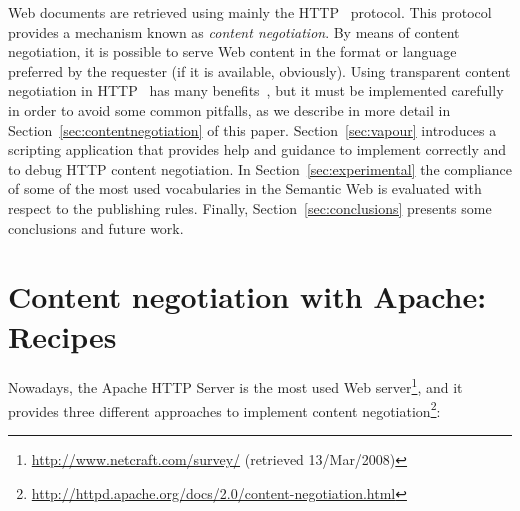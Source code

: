 \documentclass{../templates/llncs}
\begin{document}
Web documents are retrieved using mainly the HTTP~\cite{HTTP} 
protocol. This protocol provides a mechanism known as \textit{content negotiation}. 
By means of content negotiation, it is possible to serve Web content in the format or 
language preferred by the requester (if it is available, obviously). Using transparent content negotiation 
in HTTP~\cite{Holtman1998} has many benefits~\cite{Seshan1998}, but it must be 
implemented carefully in order to avoid some common pitfalls, as we describe in more detail in 
Section~\ref{sec:contentnegotiation} of this paper. Section~\ref{sec:vapour} introduces 
a scripting application that provides help and guidance to implement correctly and to debug
HTTP content negotiation. In Section~\ref{sec:experimental} the
compliance of some of the most used
vocabularies in the Semantic Web is evaluated with respect to the publishing rules. Finally, Section~\ref{sec:conclusions} presents 
some conclusions and future work.


\section{\label{sec:contentnegotiation}Content negotiation with Apache: Recipes}


Nowadays, the Apache HTTP Server is the most used Web server\footnote{\url{http://www.netcraft.com/survey/} (retrieved 13/Mar/2008)}, 
and it provides three different approaches to implement content negotiation\footnote{\url{http://httpd.apache.org/docs/2.0/content-negotiation.html}}:
\end{document}
